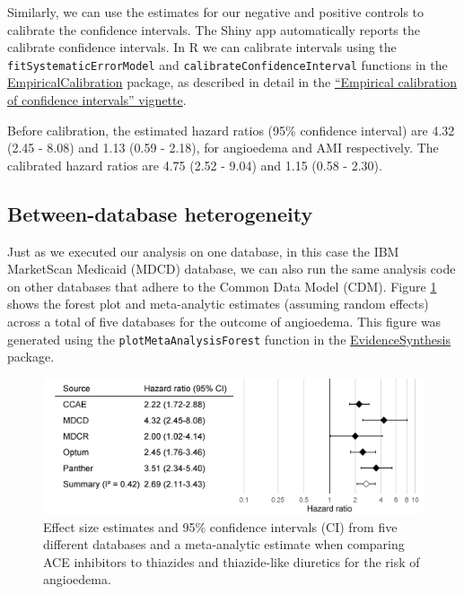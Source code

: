 \documentclass[11pt]{book}
\theoremstyle{definition}
\theoremstyle{definition}
\theoremstyle{definition}
\theoremstyle{remark}
\begin{document}
Similarly, we can use the estimates for our negative and positive controls to calibrate the confidence intervals. The Shiny app automatically reports the calibrate confidence intervals. In R we can calibrate intervals using the \texttt{fitSystematicErrorModel} and \texttt{calibrateConfidenceInterval} functions in the \href{https://ohdsi.github.io/EmpiricalCalibration/}{EmpiricalCalibration} package, as described in detail in the \href{https://ohdsi.github.io/EmpiricalCalibration/articles/EmpiricalCiCalibrationVignette.html}{``Empirical calibration of confidence intervals'' vignette}.

Before calibration, the estimated hazard ratios (95\% confidence interval) are 4.32 (2.45 - 8.08) and 1.13 (0.59 - 2.18), for angioedema and AMI respectively. The calibrated hazard ratios are 4.75 (2.52 - 9.04) and 1.15 (0.58 - 2.30).

\hypertarget{between-database-heterogeneity}{%
\subsection{Between-database heterogeneity}\label{between-database-heterogeneity}}

Just as we executed our analysis on one database, in this case the IBM MarketScan Medicaid (MDCD) database, we can also run the same analysis code on other databases that adhere to the Common Data Model (CDM). Figure \ref{fig:forest} shows the forest plot and meta-analytic estimates (assuming random effects) \citep{dersimonian_1986} across a total of five databases for the outcome of angioedema. This figure was generated using the \texttt{plotMetaAnalysisForest} function in the \href{https://ohdsi.github.io/EvidenceSynthesis/}{EvidenceSynthesis} package.

\begin{figure}

{\centering \includegraphics[width=0.9\linewidth]{images/MethodValidity/forest} 

}

\caption{Effect size estimates and 95\% confidence intervals (CI) from five different databases and a meta-analytic estimate when comparing ACE inhibitors to thiazides and thiazide-like diuretics for the risk of angioedema.}\label{fig:forest}
\end{figure}
\end{document}
